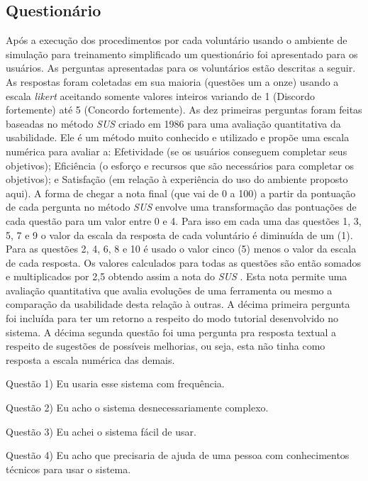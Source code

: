 \subsection{Questionário}
\label{sec:questionarioUsabilidade}

Após a execução dos procedimentos por cada voluntário usando o ambiente de simulação para treinamento simplificado um questionário foi apresentado para os usuários. As perguntas apresentadas para os voluntários estão descritas a seguir. As respostas foram coletadas em sua maioria (questões um a onze) usando a escala \textit{likert} \cite{Norman2010} aceitando somente valores inteiros variando de 1 (Discordo fortemente) até 5 (Concordo fortemente). As dez primeiras perguntas foram feitas baseadas no método \textit{\acrfull{SUS}} \cite{Brooke2013} criado em 1986 para uma avaliação quantitativa da usabilidade. Ele é um método muito conhecido e utilizado e propõe uma escala numérica para avaliar a: Efetividade (se os usuários conseguem completar seus objetivos); 
Eficiência (o esforço e recursos que são necessários para completar os objetivos); e
Satisfação (em relação à experiência do uso do ambiente proposto aqui). A forma de chegar a nota final (que vai de 0 a 100) a partir da pontuação de cada pergunta no método \textit{\acrshort{SUS}} \cite{Brooke2013} envolve uma transformação das pontuações de cada questão para  um valor entre 0 e 4. Para isso em cada uma das questões 1, 3, 5, 7 e 9 o valor da escala da resposta de cada voluntário é diminuída de um (1). Para as questões 2, 4, 6, 8 e 10 é usado o valor cinco (5) menos o valor da escala de cada resposta. Os valores calculados para todas as questões são então somados e multiplicados por 2,5 obtendo assim a nota do \textit{\acrshort{SUS}} \cite{Brooke2013}. Esta nota permite uma avaliação quantitativa que avalia evoluções de uma ferramenta ou mesmo a comparação da usabilidade desta relação à outras. 
A décima primeira pergunta foi incluída para ter um retorno a respeito do modo tutorial desenvolvido no sistema. A décima segunda questão foi uma pergunta pra resposta textual a respeito de sugestões de possíveis melhorias, ou seja, esta não tinha como resposta a escala numérica das demais.

Questão 1) Eu usaria esse sistema com frequência.

Questão 2) Eu acho o sistema desnecessariamente complexo.

Questão 3) Eu achei o sistema fácil de usar.

Questão 4) Eu acho que precisaria de ajuda de uma pessoa com conhecimentos técnicos para usar o sistema.

